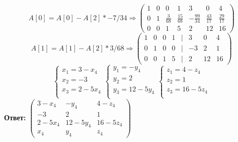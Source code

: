 \documentclass[a4paper]{article}
\newcommand{\mat}[1]{\begin{pmatrix} #1 \end{pmatrix}}
\newcommand{\case}[1]{\begin{cases} #1 \end{cases}}
\renewcommand{\r}{\Rightarrow}
\begin{document}
\begin{enumerate}
{    $$A[0] = A[0]-A[2]*-7/34 \r \mat{1 & 0 & 0 & 1 & 3 & 0 & 4 \\ 0 & 1 & \frac{3}{68} & \frac{15}{68} & -\frac{99}{34} & \frac{43}{17} & \frac{29}{17} \\ 0 & 0 & 1 & 5 & 2 & 12 & 16}$$
    $$A[1] = A[1]-A[2]*3/68 \r \mat{1 & 0 & 0 & 1 & | & 3 & 0 & 4 \\ 0 & 1 & 0 & 0 &| & -3 & 2 & 1 \\ 0 & 0 & 1 & 5 & | & 2 & 12 & 16}$$
    $$\case{
        x_1 = 3- x_4\\
        x_2 =-3\\
        x_3 = 2 - 5x_4\\
    }\case{
        y_1 = -y_4\\
        y_2 = 2\\
        y_3 = 12 - 5y_4\\ 
    }\case{
        z_1 = 4- z_4\\
        z_2 =1\\
        z_3 =16 - 5z_4\\
    }$$
    \textbf{Ответ: } $\mat{3- x_4 & -y_4& 4- z_4 \\ -3 & 2 & 1 \\ 2 - 5x_4 & 12 - 5y_4 & 16 - 5z_4 \\  x_4 & y_4 & z_4}$
    }\\\\


\end{enumerate}
\end{document}
